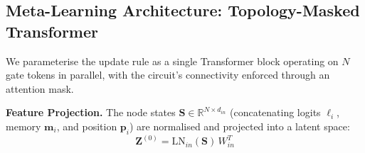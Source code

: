 



\subsection{Meta-Learning Architecture: Topology-Masked Transformer}
\label{sec:architecture}

We parameterise the update rule as a single Transformer block operating on $N$ gate tokens in parallel, with the circuit's connectivity enforced through an attention mask.

\textbf{Feature Projection.}
The node states $\mathbf{S} \in \mathbb{R}^{N \times d_{in}}$ (concatenating logits $\boldsymbol{\ell}_i$, memory $\mathbf{m}_i$, and position $\mathbf{p}_i$) are normalised and projected into a latent space:
\begin{equation}
    \mathbf{Z}^{(0)} = \text{LN}_{in}(\mathbf{S})\, W_{in}^T
\end{equation}


